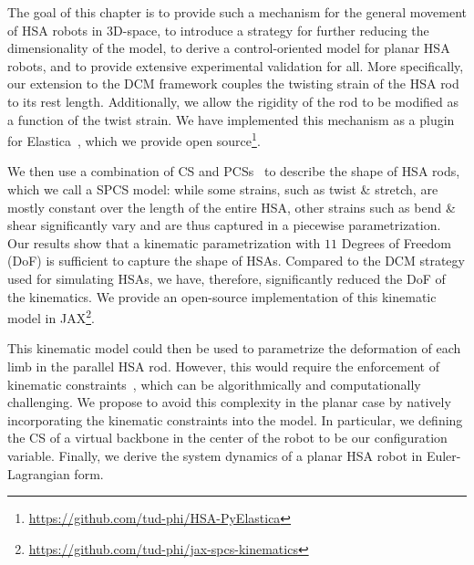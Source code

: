 The goal of this chapter is to provide such a mechanism for the general movement of \gls{HSA} robots in 3D-space, to introduce a strategy for further reducing the dimensionality of the model, to derive a control-oriented model for planar \gls{HSA} robots, and to provide extensive experimental validation for all. 
More specifically, our extension to the \gls{DCM} framework couples the twisting strain of the \gls{HSA} rod to its rest length. %
Additionally, we allow the rigidity of the rod to be modified as a function of the twist strain. %
We have implemented this mechanism as a plugin for Elastica~\citep{naughton2021elastica}, which we provide open source\footnote{\url{https://github.com/tud-phi/HSA-PyElastica}}. 

We then use a combination of \gls{CS} and \glspl{PCS}~\citep{renda2018discrete} to describe the shape of \gls{HSA} rods, which we call a \gls{SPCS} model: while some strains, such as twist \& stretch, are mostly constant over the length of the entire \gls{HSA}, other strains such as bend \& shear significantly vary and are thus captured in a piecewise parametrization. 
Our results show that a kinematic parametrization with $11$ Degrees of Freedom (DoF) is sufficient to capture the shape of \glspl{HSA}.
Compared to the \gls{DCM} strategy used for simulating \glspl{HSA}, we have, therefore, significantly reduced the DoF of the kinematics.
We provide an open-source implementation of this kinematic model in JAX\footnote{\scriptsize \url{https://github.com/tud-phi/jax-spcs-kinematics}}.

This kinematic model could then be used to parametrize the deformation of each limb in the parallel \gls{HSA} rod.
However, this would require the enforcement of kinematic constraints~\citep {armanini2021discrete}, which can be algorithmically and computationally challenging.
We propose to avoid this complexity in the planar case by natively incorporating the kinematic constraints into the model. In particular, we 
defining the \gls{CS} of a virtual backbone in the center of the robot to be our configuration variable.
Finally, we derive the system dynamics of a planar \gls{HSA} robot in Euler-Lagrangian form.

